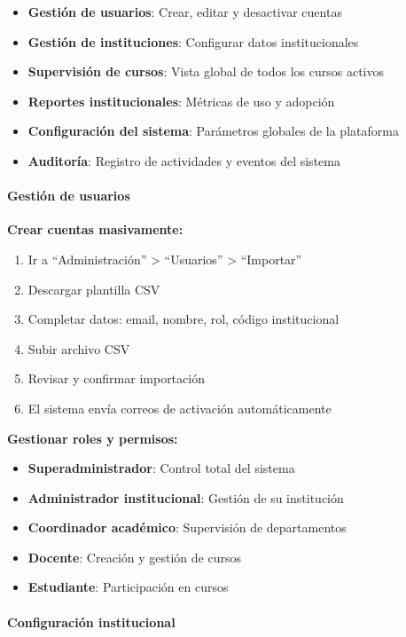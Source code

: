 \begin{itemize}
	\item \textbf{Gestión de usuarios}: Crear, editar y desactivar cuentas
	\item \textbf{Gestión de instituciones}: Configurar datos institucionales
	\item \textbf{Supervisión de cursos}: Vista global de todos los cursos activos
	\item \textbf{Reportes institucionales}: Métricas de uso y adopción
	\item \textbf{Configuración del sistema}: Parámetros globales de la plataforma
	\item \textbf{Auditoría}: Registro de actividades y eventos del sistema
\end{itemize}

\paragraph{Gestión de usuarios}

\textbf{Crear cuentas masivamente:}

\begin{enumerate}
	\item Ir a ``Administración'' > ``Usuarios'' > ``Importar''
	\item Descargar plantilla CSV
	\item Completar datos: email, nombre, rol, código institucional
	\item Subir archivo CSV
	\item Revisar y confirmar importación
	\item El sistema envía correos de activación automáticamente
\end{enumerate}

\textbf{Gestionar roles y permisos:}

\begin{itemize}
	\item \textbf{Superadministrador}: Control total del sistema
	\item \textbf{Administrador institucional}: Gestión de su institución
	\item \textbf{Coordinador académico}: Supervisión de departamentos
	\item \textbf{Docente}: Creación y gestión de cursos
	\item \textbf{Estudiante}: Participación en cursos
\end{itemize}

\paragraph{Configuración institucional}

